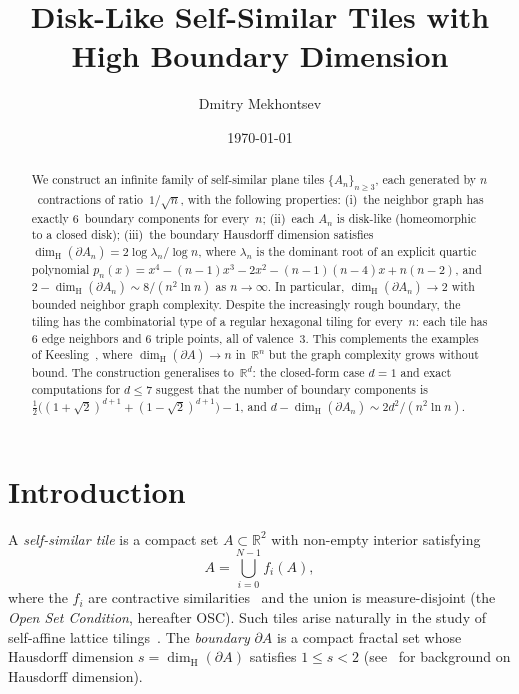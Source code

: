 \documentclass{amsart}
\title{Disk-Like Self-Similar Tiles with High Boundary Dimension}
\author{Dmitry Mekhontsev}
\date{\today}
\theoremstyle{definition}
\theoremstyle{remark}
\newcommand{\R}{\mathbb{R}}
\newcommand{\dH}{\dim_{\mathrm{H}}}
\begin{document}
\begin{abstract}
We construct an infinite family of self-similar plane tiles
$\{A_n\}_{n \ge 3}$, each generated by $n$~contractions of
ratio~$1/\!\sqrt{n}$, with the following properties:
(i)~the neighbor graph has exactly $6$~boundary components for
every~$n$;
(ii)~each $A_n$ is disk-like (homeomorphic to a closed disk);
(iii)~the boundary Hausdorff dimension satisfies
$\dH(\partial A_n) = 2\log\lambda_n/\log n$, where $\lambda_n$ is
the dominant root of an explicit quartic polynomial
$p_n(x) = x^4 - (n{-}1)x^3 - 2x^2 - (n{-}1)(n{-}4)x + n(n{-}2)$,
and $2 - \dH(\partial A_n) \sim 8/(n^2\ln n)$ as $n \to \infty$.
In particular, $\dH(\partial A_n) \to 2$ with bounded neighbor
graph complexity.  Despite the increasingly rough boundary,
the tiling has the combinatorial type of a regular hexagonal
tiling for every~$n$: each tile has $6$ edge neighbors and
$6$ triple points, all of valence~$3$.
This complements the examples of
Keesling~\cite{keesling}, where $\dH(\partial A) \to n$
in~$\R^n$ but the graph complexity grows without bound.
The construction generalises to~$\R^d$: the closed-form case
$d = 1$ and exact computations for $d \le 7$ suggest that the
number of boundary components is $\tfrac{1}{2}\bigl((1{+}\sqrt 2)^{d+1}
+ (1{-}\sqrt 2)^{d+1}\bigr) - 1$, and
$d - \dH(\partial A_n) \sim 2d^2/(n^2\ln n)$.
\end{abstract}

\maketitle

\section{Introduction}
\label{sec:intro}

A \emph{self-similar tile} is a compact set $A \subset \R^2$ with
non-empty interior satisfying
\[
  A = \bigcup_{i=0}^{N-1} f_i(A),
\]
where the $f_i$ are contractive similarities~\cite{hutchinson} and the union is
measure-disjoint (the \emph{Open Set Condition}, hereafter OSC).
Such tiles arise naturally in the study of
self-affine lattice tilings~\cite{lagarias-wang}.
The \emph{boundary} $\partial A$ is a compact fractal set whose
Hausdorff dimension $s = \dH(\partial A)$ satisfies
$1 \le s < 2$
(see~\cite{falconer} for background on Hausdorff dimension).
\end{document}
